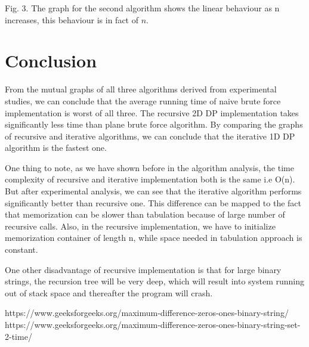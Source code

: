 \documentclass[conference]{IEEEtran}
\begin{document}
{Fig. 3. The graph for the second algorithm shows the linear behaviour as n increases, this behaviour is in fact of
$n$.\\



\section{Conclusion}
\label{conclusion}
From the mutual graphs of all three algorithms derived from experimental studies, we can conclude that the average running time of naive brute force implementation is worst of all three. The recursive 2D DP implementation takes significantly less time than plane brute force algorithm. By comparing the graphs of recursive and iterative algorithms, we can conclude that the iterative 1D DP algorithm is the fastest one.

One thing to note, as we have shown before in the algorithm analysis, the time complexity of recursive and iterative implementation both is the same i.e O(n). But after experimental analysis, we can see that the iterative algorithm performs significantly better than recursive one. This difference can be mapped to the fact that memorization can be slower than tabulation because of large number of recursive calls. Also, in the recursive implementation, we have to initialize memorization container of length n, while space needed in tabulation approach is constant.

One other disadvantage of recursive implementation is that for large binary strings, the recursion tree will be very deep, which  will result into system running out of stack space and thereafter the program will crash.

\begin{thebibliography}{00}
 https://www.geeksforgeeks.org/maximum-difference-zeros-ones-binary-string/
 https://www.geeksforgeeks.org/maximum-difference-zeros-ones-binary-string-set-2-time/
\end{thebibliography}
}
\end{document}
